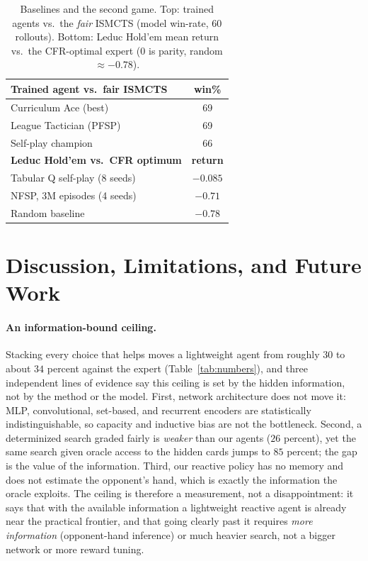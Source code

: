 \documentclass[letterpaper]{article} %
\begin{document}
\begin{table}[t]
\centering
\small
\caption{Baselines and the second game. Top: trained agents vs.\ the \emph{fair}
ISMCTS (model win-rate, $60$ rollouts). Bottom: Leduc Hold'em mean return vs.\ the
CFR-optimal expert ($0$ is parity, random $\approx-0.78$).}
\label{tab:baselines}
\begin{tabular}{@{}lc@{}}
\toprule
\textbf{Trained agent vs.\ fair ISMCTS} & \textbf{win\%} \\
\midrule
Curriculum Ace (best)            & 69 \\
League Tactician (PFSP)          & 69 \\
Self-play champion               & 66 \\
\midrule
\textbf{Leduc Hold'em vs.\ CFR optimum} & \textbf{return} \\
\midrule
Tabular Q self-play (8 seeds)    & $-0.085$ \\
NFSP, 3M episodes (4 seeds)      & $-0.71$ \\
Random baseline                  & $-0.78$ \\
\bottomrule
\end{tabular}
\end{table}

\section{Discussion, Limitations, and Future Work}
\paragraph{An information-bound ceiling.}
Stacking every choice that helps moves a lightweight agent from roughly $30$ to
about $34$ percent against the expert (Table~\ref{tab:numbers}), and three
independent lines of evidence say this ceiling is set by the hidden information,
not by the method or the model. First, network architecture does not move it: MLP,
convolutional, set-based, and recurrent encoders are statistically
indistinguishable, so capacity and inductive bias are not the bottleneck. Second,
a determinized search graded fairly is \emph{weaker} than our agents ($26$ percent),
yet the same search given oracle access to the hidden cards jumps to $85$ percent;
the gap is the value of the information. Third, our reactive policy has no memory
and does not estimate the opponent's hand, which is exactly the information the
oracle exploits. The ceiling is therefore a measurement, not a disappointment: it
says that with the available information a lightweight reactive agent is already
near the practical frontier, and that going clearly past it requires \emph{more
information} (opponent-hand inference) or much heavier search, not a bigger network
or more reward tuning.
\end{document}
